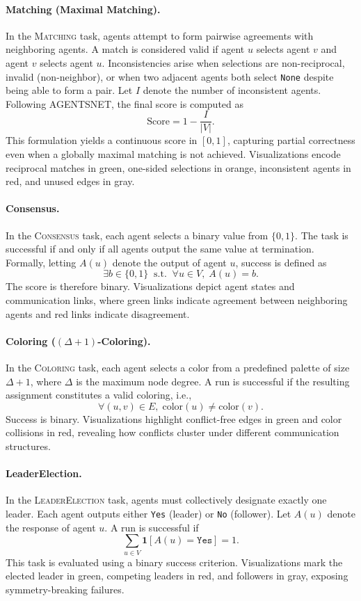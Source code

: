 \paragraph{Matching (Maximal Matching).}
In the \textsc{Matching} task, agents attempt to form pairwise agreements with neighboring agents. A match is considered valid if agent \(u\) selects agent \(v\) and agent \(v\) selects agent \(u\). Inconsistencies arise when selections are non-reciprocal, invalid (non-neighbor), or when two adjacent agents both select \texttt{None} despite being able to form a pair. Let \(I\) denote the number of inconsistent agents. Following AGENTSNET, the final score is computed as
\[
\text{Score} = 1 - \frac{I}{|V|}.
\]
This formulation yields a continuous score in \([0,1]\), capturing partial correctness even when a globally maximal matching is not achieved. Visualizations encode reciprocal matches in green, one-sided selections in orange, inconsistent agents in red, and unused edges in gray.

\paragraph{Consensus.}
In the \textsc{Consensus} task, each agent selects a binary value from \(\{0,1\}\). The task is successful if and only if all agents output the same value at termination. Formally, letting \(A(u)\) denote the output of agent \(u\), success is defined as
\[
\exists b \in \{0,1\} \;\; \text{s.t.} \;\; \forall u \in V,\; A(u) = b.
\]
The score is therefore binary. Visualizations depict agent states and communication links, where green links indicate agreement between neighboring agents and red links indicate disagreement.

\paragraph{Coloring (\((\Delta+1)\)-Coloring).}
In the \textsc{Coloring} task, each agent selects a color from a predefined palette of size \(\Delta + 1\), where \(\Delta\) is the maximum node degree. A run is successful if the resulting assignment constitutes a valid coloring, i.e.,
\[
\forall (u,v) \in E,\; \text{color}(u) \neq \text{color}(v).
\]
Success is binary. Visualizations highlight conflict-free edges in green and color collisions in red, revealing how conflicts cluster under different communication structures.

\paragraph{LeaderElection.}
In the \textsc{LeaderElection} task, agents must collectively designate exactly one leader. Each agent outputs either \texttt{Yes} (leader) or \texttt{No} (follower). Let \(A(u)\) denote the response of agent \(u\). A run is successful if
\[
\sum_{u \in V} \mathbf{1}[A(u) = \texttt{Yes}] = 1.
\]
This task is evaluated using a binary success criterion. Visualizations mark the elected leader in green, competing leaders in red, and followers in gray, exposing symmetry-breaking failures.

